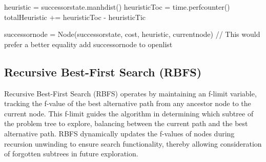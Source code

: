 \documentclass{article}
\begin{document}
\begin{algorithm}[h]
\begin{algorithmic}
            \Else 
            \State heuristic = successorstate.manhdist()
            \EndIf
            \State heuristicToc = time.perfcounter()
            \State totalHeuristic += heuristicToc - heuristicTic
            
            \State successornode = Node(successorstate, cost, heuristic, currentnode)
              // This would prefer a better equality
            \State add successornode to openlist
            \EndIf

            \EndFor
            \EndWhile

   \end{algorithmic}
   
   
   \label{alg:A$^*$}
 \end{algorithm}


\subsection{Recursive Best-First Search (RBFS)}
Recursive Best-First Search (RBFS) operates by maintaining an f-limit variable, tracking the f-value of the best alternative path from any ancestor node to the current node. This f-limit guides the algorithm in determining which subtree of the problem tree to explore, balancing between the current path and the best alternative path. RBFS dynamically updates the f-values of nodes during recursion unwinding to ensure search functionality, thereby allowing consideration of forgotten subtrees in future exploration.
\end{document}
